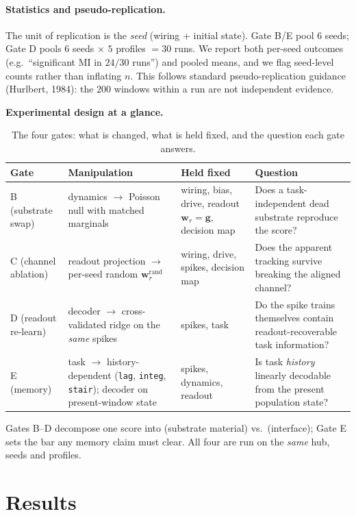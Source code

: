 \documentclass[12pt]{article}
\begin{document}
\paragraph{Statistics and pseudo-replication.} The unit of replication
is the \emph{seed} (wiring + initial state). Gate B/E pool $6$ seeds;
Gate D pools $6$ seeds $\times$ $5$ profiles $=30$ runs. We report both
per-seed outcomes (e.g.\ ``significant MI in $24/30$ runs'') and pooled
means, and we flag seed-level counts rather than inflating $n$. This
follows standard pseudo-replication guidance (Hurlbert, 1984): the
$200$ windows within a run are not independent evidence.

\noindent
\textbf{Experimental design at a glance.}
\begin{table}[H]
\centering
\caption{The four gates: what is changed, what is held fixed, and the
question each gate answers.}
\label{tab:design}
\small
\begin{tabular}{@{}p{5.5em}p{12em}p{11.5em}p{16em}@{}}
\toprule
\textbf{Gate} & \textbf{Manipulation} & \textbf{Held fixed} &
\textbf{Question} \\
\midrule
B (substrate
swap) & dynamics $\to$ Poisson
null with matched marginals
& wiring, bias, drive,
readout $\mathbf{w}_r=\mathbf{g}$, decision map
& Does a task-independent
dead substrate reproduce
the score? \\
C (channel
ablation) & readout projection
$\to$ per-seed random $\mathbf{w}_r^{\mathrm{rand}}$
& wiring, drive, spikes,
decision map
& Does the apparent tracking
survive breaking the aligned
channel? \\
D (readout
re-learn) & decoder $\to$ cross-validated ridge on
the \emph{same} spikes
& spikes, task
& Do the spike trains themselves
contain readout-recoverable task
information? \\
E (memory) & task $\to$ history-dependent
(\texttt{lag}, \texttt{integ},
\texttt{stair}); decoder on
present-window state
& spikes, dynamics, readout
& Is task \emph{history} linearly
decodable from the present
population state? \\
\bottomrule
\end{tabular}
\end{table}
Gates B--D decompose one score into (substrate material) vs.\
(interface); Gate E sets the bar any memory claim must clear. All four
are run on the \emph{same} hub, seeds and profiles.

\section{Results}\label{sec:results}
\end{document}

